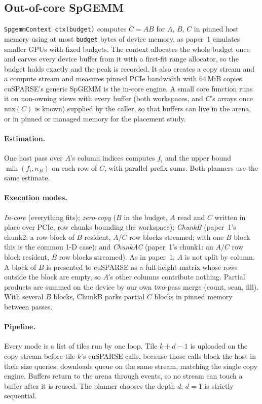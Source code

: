 \subsection{Out-of-core SpGEMM}\label{sec:design-spgemm}
\texttt{SpgemmContext ctx(budget)} computes $C = AB$ for $A$, $B$, $C$ in pinned host memory using at most
\texttt{budget} bytes of device memory, as paper~1 emulates smaller GPUs with fixed budgets. The context allocates
the whole budget once and carves every device buffer from it with a first-fit range allocator, so the budget holds
exactly and the peak is recorded. It also creates a copy stream and a compute stream and measures pinned PCIe
bandwidth with 64\,MiB copies. cuSPARSE's generic SpGEMM is the in-core engine. A small core function runs it on
non-owning views with every buffer (both workspaces, and $C$'s arrays once $\mathrm{nnz}(C)$ is known) supplied by
the caller, so that buffers can live in the arena, or in pinned or managed memory for the placement study.

\paragraph{Estimation.} One host pass over $A$'s column indices computes $f_i$ and the upper bound
$\min(f_i, n_B)$ on each row of $C$, with parallel prefix sums. Both planners use the same estimate.

\paragraph{Execution modes.} \emph{In-core} (everything fits); \emph{zero-copy} ($B$ in the budget, $A$ read and
$C$ written in place over PCIe, row chunks bounding the workspace); \emph{ChunkB} (paper~1's chunk2: a row block of
$B$ resident, $A$/$C$ row blocks streamed; with one $B$ block this is the common 1-D case); and \emph{ChunkAC}
(paper~1's chunk1: an $A$/$C$ row block resident, $B$ row blocks streamed). As in paper~1, $A$ is not split by
column. A block of $B$ is presented to cuSPARSE as a full-height matrix whose rows outside the block are empty, so
$A$'s other columns contribute nothing. Partial products are summed on the device by our own two-pass merge
(count, scan, fill). With several $B$ blocks, ChunkB parks partial $C$ blocks in pinned memory between passes.

\paragraph{Pipeline.} Every mode is a list of tiles run by one loop. Tile $k+d-1$ is uploaded on the copy stream
before tile $k$'s cuSPARSE calls, because those calls block the host in their size queries; downloads queue on the
same stream, matching the single copy engine. Buffers return to the arena through events, so no stream can touch a
buffer after it is reused. The planner chooses the depth $d$; $d=1$ is strictly sequential.

